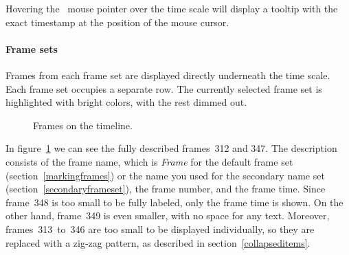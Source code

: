 \documentclass[hidelinks,titlepage,a4paper]{article}
\begin{document}
Hovering the \faMousePointer{}~mouse pointer over the time scale will display a tooltip with the exact timestamp at the position of the mouse cursor.

\paragraph{Frame sets}
\label{framesets}

Frames from each frame set are displayed directly underneath the time scale. Each frame set occupies a separate row. The currently selected frame set is highlighted with bright colors, with the rest dimmed out.

\begin{figure}[h]
\centering{}
\caption{Frames on the timeline.}
\label{framesetsfig}
\end{figure}

In figure~\ref{framesetsfig} we can see the fully described frames~312 and 347. The description consists of the frame name, which is \emph{Frame} for the default frame set (section~\ref{markingframes}) or the name you used for the secondary name set (section~\ref{secondaryframeset}), the frame number, and the frame time. Since frame~348 is too small to be fully labeled, only the frame time is shown. On the other hand, frame~349 is even smaller, with no space for any text. Moreover, frames~313~to~346 are too small to be displayed individually, so they are replaced with a zig-zag pattern, as described in section~\ref{collapseditems}.
\end{document}
